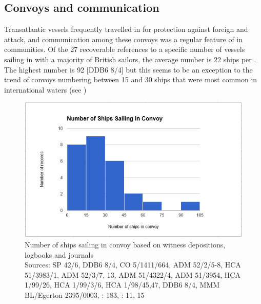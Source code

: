 \subsection{{Convoys and communication}}\label{sec:4.3.2}

Transatlantic vessels frequently travelled in  for protection against foreign and  attack, and communication among these convoys was a regular feature of  in  communities. Of the 27 recoverable references to a specific number of vessels sailing in  with a majority of British sailors, the average number is 22 ships per . The highest number is 92 [DDB6 8/4] but this seems to be an exception to the trend of convoys numbering between 15 and 30 ships that were most common in international waters (see ) 

\begin{figure}
\includegraphics[width=\textwidth]{figures/delgado-img15.png}
\caption{\label{fig:key:4.7} Number of ships sailing in convoy based on witness depositions, logbooks and journals\\
{\tiny
Sources: SP 42/6, DDB6 8/4, CO 5/1411/664, ADM 52/2/5-8, HCA 51/3983/1, ADM 52/3/7, 13, ADM 51/4322/4, ADM 51/3954, HCA 1/99/26, HCA 1/99/3/6, HCA 1/98/45,47, DDB6 8/4, MMM BL/Egerton 2395/0003, \citealt{Bicheno2012}: 183, \citealt{Gage1648}: 11, 15
}
}
\end{figure}

